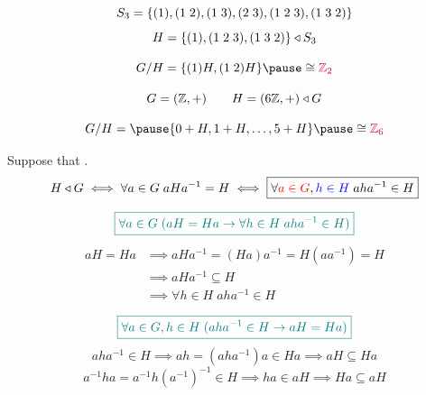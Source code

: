\begin{frame}
  \[
    S_{3} = \{(1), (1\; 2), (1\; 3), (2\; 3), (1\; 2\; 3), (1\; 3\; 2)\}
  \]
  \[
    H = \{(1), (1\; 2\; 3), (1\; 3\; 2)\} \triangleleft S_{3}
  \]

  \pause
  \[
    G/H = \set{(1)H, (1\;2)H} \pause \cong \purple{\Z_{2}}
  \]
\end{frame}

\begin{frame}
  \[
    G = (\mathbb{Z}, +) \qquad H = (6\mathbb{Z}, +) \triangleleft G
  \]

  \[
    G/H = \pause \set{0 + H, 1 + H, \dots, 5 + H} \pause \cong \purple{\Z_{6}}
  \]
\end{frame}

\begin{frame}
  \begin{theorem}
    Suppose that .
    \[
      H \triangleleft G
        \iff \forall a \in G\; aHa^{-1} = H
        \iff \boxed{\forall \textcolor{red}{a \in G}, \textcolor{blue}{h \in H}\; aha^{-1} \in H}
    \]
  \end{theorem}

  \pause
  \[
    \textcolor{teal}{\boxed{\forall a \in G\;
      (aH = Ha \to \forall h \in H\; aha^{-1} \in H)}}
  \]
  \begin{align*}
    aH = Ha &\implies aHa^{-1} = (Ha)a^{-1} = H(aa^{-1}) = H \\
            &\implies aHa^{-1} \subseteq H \\
            &\implies \forall h \in H\; aha^{-1} \in H
  \end{align*}

  \pause
  \[
    \textcolor{teal}{\boxed{\forall a \in G, h \in H\;
      (aha^{-1} \in H \to aH = Ha)}}
  \]
  \pause
  \[
    aha^{-1} \in H \implies ah = (aha^{-1})a \in Ha \implies aH \subseteq Ha
  \]
  \pause
  \vspace{-0.30cm}
  \[
    a^{-1}ha = a^{-1}h(a^{-1})^{-1} \in H \implies ha \in aH \implies Ha \subseteq aH
  \]
\end{frame}

